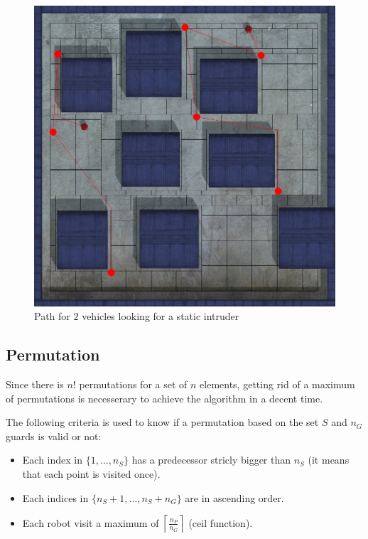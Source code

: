 \begin{figure}[h!t]
	\begin{center}
	\includegraphics[width=\linewidth,natwidth=824,natheight=823]{fig/dynamicPath.jpg}
	\end{center}
	\caption{Path for $2$ vehicles looking for a static intruder}
	\label{dynamicPath}
\end{figure}

\subsection{Permutation}

Since there is $n!$ permutations for a set of $n$ elements, getting rid of a maximum of permutations is necesserary to achieve the algorithm in a decent time. 

\begin{criteria}
 The following criteria is used to know if a permutation based on the set $S$ and $n_G$ guards is valid or not:
 \begin{itemize}
  \item Each index in $\{1,\hdots,n_S\}$ has a predecessor stricly bigger than $n_S$ (it means that each point is visited once).
  \item Each indices in $\{n_S+1,\hdots,n_S+n_G\}$ are in ascending order.
  \item Each robot visit a maximum of $\left \lceil{\frac{n_P}{n_G}}\right \rceil$ (ceil function).
 \end{itemize}
 \label{permCriteria}
\end{criteria}